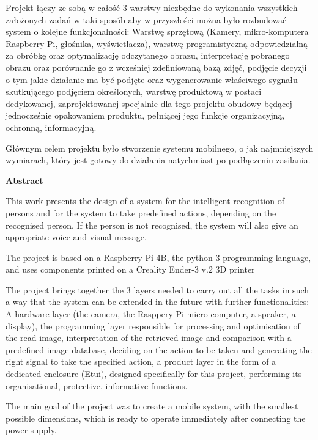 \documentclass[a4paper,12pt,reqno]{article}
\begin{document}
Projekt łączy ze sobą w całość 3 warstwy niezbędne do wykonania wszystkich założonych zadań w taki sposób aby w przyszłości można było rozbudować system o kolejne funkcjonalności: Warstwę sprzętową (Kamery, mikro-komputera Raspberry Pi, głośnika, wyświetlacza), warstwę programistyczną odpowiedzialną za obróbkę oraz optymalizację odczytanego obrazu, interpretację pobranego obrazu oraz porównanie go z wcześniej zdefiniowaną bazą zdjęć, podjęcie decyzji o tym jakie działanie ma być podjęte oraz wygenerowanie właściwego sygnału skutkującego podjęciem określonych, warstwę produktową w postaci dedykowanej, zaprojektowanej specjalnie dla tego projektu obudowy będącej jednocześnie opakowaniem produktu, pełniącej jego funkcje organizacyjną, ochronną, informacyjną.

Głównym celem projektu było stworzenie systemu mobilnego, o jak najmniejszych wymiarach, który jest gotowy do działania natychmiast po podłączeniu zasilania.

%
%
\newpage
\begin{flushleft}
\Large \textbf{Abstract}
\end{flushleft}
\vspace{1cm}

This work presents the design of a system for the intelligent recognition of persons and for the system to take predefined actions, depending on the recognised person. If the person is not recognised, the system will also give an appropriate voice and visual message.

The project is based on a Raspberry Pi 4B, the python 3 programming language, and uses components printed on a Creality Ender-3 v.2 3D printer

The project brings together the 3 layers needed to carry out all the tasks in such a way that the system can be extended in the future with further functionalities: A hardware layer (the camera, the Rasppery Pi micro-computer, a speaker, a display), the programming layer responsible for processing and optimisation of the read image, interpretation of the retrieved image and comparison with a predefined image database, deciding on the action to be taken and generating the right signal to take the specified action, a product layer in the form of a dedicated enclosure (Etui), designed specifically for this project, performing its organisational, protective, informative functions.

The main goal of the project was to create a mobile system, with the smallest possible dimensions, which is ready to operate immediately after connecting the power supply.
\end{document}
